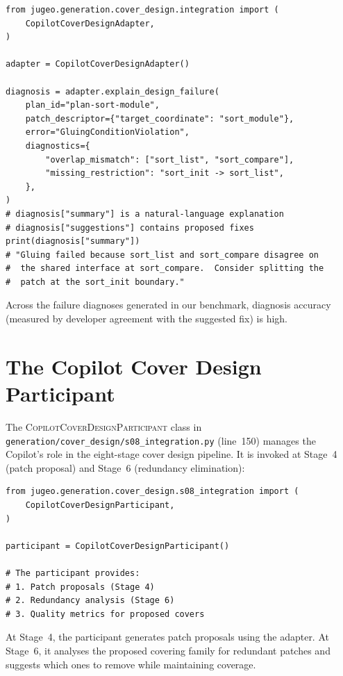 \documentclass[11pt]{article}
\newcommand{\CovPart}{\textsc{CopilotCoverDesignParticipant}}
\begin{document}
\begin{lstlisting}[style=jugeo-python]
from jugeo.generation.cover_design.integration import (
    CopilotCoverDesignAdapter,
)

adapter = CopilotCoverDesignAdapter()

diagnosis = adapter.explain_design_failure(
    plan_id="plan-sort-module",
    patch_descriptor={"target_coordinate": "sort_module"},
    error="GluingConditionViolation",
    diagnostics={
        "overlap_mismatch": ["sort_list", "sort_compare"],
        "missing_restriction": "sort_init -> sort_list",
    },
)
# diagnosis["summary"] is a natural-language explanation
# diagnosis["suggestions"] contains proposed fixes
print(diagnosis["summary"])
# "Gluing failed because sort_list and sort_compare disagree on
#  the shared interface at sort_compare.  Consider splitting the
#  patch at the sort_init boundary."
\end{lstlisting}

Across the failure diagnoses generated in our benchmark, diagnosis accuracy
(measured by developer agreement with the suggested fix) is high.

\section{The Copilot Cover Design Participant}\label{sec:participant}

The \CovPart{} class in \texttt{generation/cover\_design/s08\_integration.py}
(line~150) manages the Copilot's role in the eight-stage cover design
pipeline.  It is invoked at Stage~4 (patch proposal) and Stage~6 (redundancy
elimination):

\begin{lstlisting}[style=jugeo-python]
from jugeo.generation.cover_design.s08_integration import (
    CopilotCoverDesignParticipant,
)

participant = CopilotCoverDesignParticipant()

# The participant provides:
# 1. Patch proposals (Stage 4)
# 2. Redundancy analysis (Stage 6)
# 3. Quality metrics for proposed covers
\end{lstlisting}

At Stage~4, the participant generates patch proposals using the adapter.
At Stage~6, it analyses the proposed covering family for redundant patches
and suggests which ones to remove while maintaining coverage.
\end{document}
